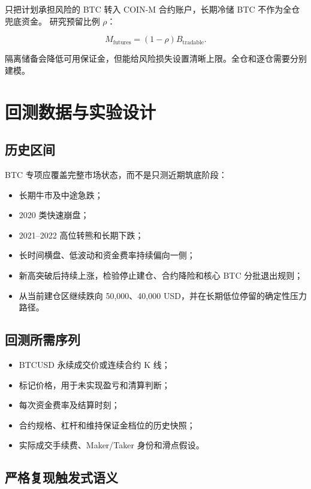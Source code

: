 \documentclass[11pt,a4paper,fontset=none]{ctexart}
\begin{document}
只把计划承担风险的 BTC 转入 COIN-M 合约账户，长期冷储 BTC 不作为全仓兜底资金。
研究预留比例 $\rho$：

\begin{equation}
  M_{\mathrm{futures}}=(1-\rho)B_{\mathrm{tradable}}.
\end{equation}

隔离储备会降低可用保证金，但能给风险损失设置清晰上限。全仓和逐仓需要分别建模。

\section{回测数据与实验设计}

\subsection{历史区间}

BTC 专项应覆盖完整市场状态，而不是只测近期筑底阶段：

\begin{itemize}
  \item 长期牛市及中途急跌；
  \item 2020 类快速崩盘；
  \item 2021--2022 高位转熊和长期下跌；
  \item 长时间横盘、低波动和资金费率持续偏向一侧；
  \item 新高突破后持续上涨，检验停止建仓、合约降险和核心 BTC 分批退出规则；
  \item 从当前建仓区继续跌向 50,000、40,000 USD，并在长期低位停留的确定性压力路径。
\end{itemize}

\subsection{回测所需序列}

\begin{itemize}
  \item BTCUSD 永续成交价或连续合约 K 线；
  \item 标记价格，用于未实现盈亏和清算判断；
  \item 每次资金费率及结算时刻；
  \item 合约规格、杠杆和维持保证金档位的历史快照；
  \item 实际成交手续费、Maker/Taker 身份和滑点假设。
\end{itemize}

\subsection{严格复现触发式语义}
\end{document}
